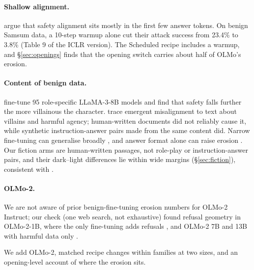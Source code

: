 \documentclass[11pt]{article}
\begin{document}
\paragraph{Shallow alignment.} \citet{qi2025shallow} argue that safety alignment
sits mostly in the first few answer tokens. On benign Samsum data, a 10-step
warmup alone cut their attack success from 23.4\% to 3.8\% (Table 9 of the ICLR
version). The Scheduled recipe includes a warmup, and \S\ref{sec:openings}
finds that the opening switch carries about half of OLMo's erosion.

\paragraph{Content of benign data.}
\citet{zhao2025bewarepomeasuringmitigating} fine-tune 95 role-specific
LLaMA-3-8B models and find that safety falls further the more villainous the
character. \citet{vetter2026dataattributionemergentmisalignment} trace
emergent misalignment to text about villains and harmful agency; human-written
documents did not reliably cause it, while synthetic instruction-answer pairs
made from the same content did. Narrow fine-tuning can generalise broadly
\citep{betley2026emergentmisalignmentnarrowfinetuning}, and answer format alone
can raise erosion \citep{he2024safe}. Our fiction arms are human-written
passages, not role-play or instruction-answer pairs, and their dark--light
differences lie within wide margins (\S\ref{sec:fiction}), consistent with
\citet{vetter2026dataattributionemergentmisalignment}.

\paragraph{OLMo-2.} We are not aware of prior benign-fine-tuning erosion
numbers for OLMo-2 Instruct; our check (one web search, not exhaustive) found
refusal geometry in OLMo-2-1B, where the only fine-tuning adds refusals
\citep{labunets2026refusalgeometryreflectsrefusal}, and OLMo-2 7B and 13B
with harmful data only \citep{lee2026refusallocalizesdamagerelocates}.

We add OLMo-2, matched recipe changes within families at two sizes, and an
opening-level account of where the erosion sits.

\end{document}
